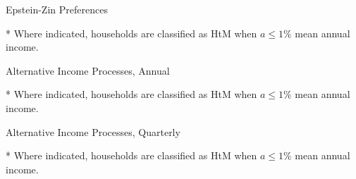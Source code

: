 \documentclass{article}
\begin{document}
\begin{table}[h]
\caption{Epstein-Zin Preferences}
\begin{threeparttable}
\centering


\begin{tablenotes}
	\item[*] Where indicated, households are classified as HtM when $a \leq 1\%$ mean annual income.
\end{tablenotes}
\end{threeparttable}
\end{table}

\begin{table}[h]
\caption{Alternative Income Processes, Annual}
\begin{threeparttable}
\centering


\begin{tablenotes}
	\item[*] Where indicated, households are classified as HtM when $a \leq 1\%$ mean annual income.
\end{tablenotes}
\end{threeparttable}
\end{table}

\begin{table}[h]
\caption{Alternative Income Processes, Quarterly}
\begin{threeparttable}
\centering


\begin{tablenotes}
	\item[*] Where indicated, households are classified as HtM when $a \leq 1\%$ mean annual income.
\end{tablenotes}
\end{threeparttable}
\end{table}
\end{document}

